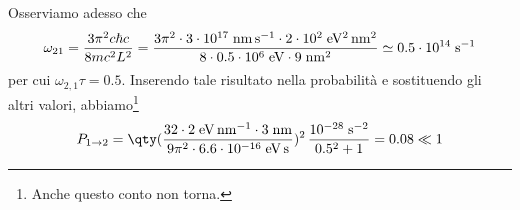 \begin{soluzione}
   Osserviamo adesso che
   \begin{equation*}
      \omega_{21}
      =\frac{3 \pi^2 c \hbar c}{8 mc^2 L^2}
      =\frac{3 \pi^2 \cdot 3 \cdot 10^{17} \; \rm nm \, s^{-1} \cdot 2 \cdot 10^2 \; eV^2 \, nm^2}{8 \cdot 0.5 \cdot 10^6 \; \rm eV \cdot 9 \; \rm nm^2}
      \simeq 0.5 \cdot 10^{14} \; \rm s^{-1}
   \end{equation*}
   per cui $\omega_{2,1}\tau=0.5$. Inserendo tale risultato nella probabilità e sostituendo gli altri valori, abbiamo\footnote{Anche questo conto non torna.}
   \begin{equation*}
      P_{1 \to 2}
      =\rm \qty( \frac{32 \cdot 2 \; eV \, nm^{-1} \cdot 3 \; nm}{9 \pi^2 \cdot 6.6 \cdot 10^{-16} \; eV \, s} )^2 \, \frac{10^{-28} \; s^{-2}}{0.5^2 + 1}
      =0.08 \ll 1
   \end{equation*}
\end{soluzione}

\newpage
\setcounter{equation}{0}